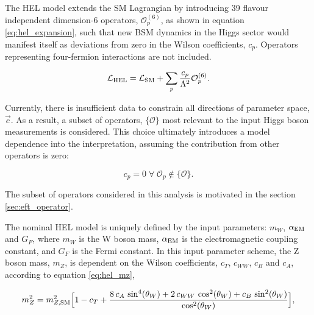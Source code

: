 The HEL model extends the SM Lagrangian by introducing 39 flavour independent dimension-6 operators, $\mathcal{O}^{(6)}_p$, as shown in equation \ref{eq:hel_expansion}, such that new BSM dynamics in the Higgs sector would manifest itself as deviations from zero in the Wilson coefficients, $c_p$. Operators representing four-fermion interactions are not included. 

\begin{equation}\label{eq:hel_expansion}
    \mathcal{L}_{\rm{HEL}} = \mathcal{L}_{\rm{SM}} + \sum_p \frac{c_p}{\Lambda^2}\mathcal{O}^{(6)}_p .
\end{equation}

\noindent
Currently, there is insufficient data to constrain all directions of parameter space, $\vec{c}$. As a result, a subset of operators, $\{\mathcal{O}\}$  most relevant to the input Higgs boson measurements is considered. This choice ultimately introduces a model dependence into the interpretation, assuming the contribution from other operators is zero: 

\begin{equation}
  c_p=0 \; \forall \; \mathcal{O}_p \notin \{\mathcal{O}\}.   
\end{equation}

\noindent
The subset of operators considered in this analysis is motivated in the section \ref{sec:eft_operator}.

The nominal HEL model is uniquely defined by the input parameters: $m_W$, $\alpha_{\rm{EM}}$ and $G_F$, where $m_W$ is the W boson mass, $\alpha_{\rm{EM}}$ is the electromagnetic coupling constant, and $G_F$ is the Fermi constant. In this input parameter scheme, the Z boson mass, $m_Z$, is dependent on the Wilson coefficients, $c_T$, $c_{WW}$, $c_B$ and $c_A$, according to equation \ref{eq:hel_mz},

\begin{equation}\label{eq:hel_mz}
    m_Z^2 = m_{Z,\rm{SM}}^2 \Big[ 1-c_T+\frac{8\,c_A\,\sin^4(\theta_W)+2\,c_{WW}\,\cos^2(\theta_W)+c_B\,\sin^2(\theta_W)}{\cos^2(\theta_W)} \Big],
\end{equation}

